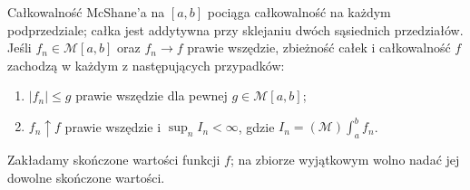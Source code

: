 \begin{wniosek}
\label{it:cor:mcshane-lebesgue-consequences}
Całkowalność McShane'a na $[a,b]$ pociąga całkowalność
na każdym podprzedziale; całka jest addytywna przy
sklejaniu dwóch sąsiednich przedziałów.
Jeśli $f_n\in\mathcal M[a,b]$ oraz $f_n\to f$ prawie
wszędzie, zbieżność całek i całkowalność $f$ zachodzą
w każdym z następujących przypadków:
\begin{enumerate}[label=(\alph*)]
\item $|f_n|\le g$ prawie wszędzie dla pewnej
$g\in\mathcal M[a,b]$;
\item $f_n\uparrow f$ prawie wszędzie i $\sup_n I_n<\infty$,
gdzie $I_n=(\mathcal M)\int_a^b f_n$.
\end{enumerate}
Zakładamy skończone wartości funkcji $f$; na zbiorze
wyjątkowym wolno nadać jej dowolne skończone wartości.
\end{wniosek}

